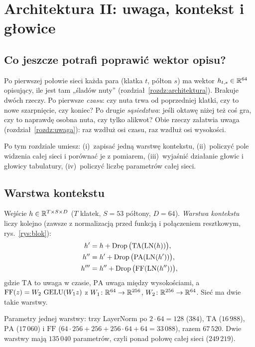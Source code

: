 \chapter{Architektura II: uwaga, kontekst i głowice}\label{rozdz:uwaga-wys}

\section{Co jeszcze potrafi poprawić wektor opisu?}

Po pierwszej połowie sieci każda para (klatka $t$, półton $s$) ma wektor $h_{t,s}\in\mathbb{R}^{64}$ opisujący, ile jest tam „śladów nuty” (rozdział~\ref{rozdz:architektura}). Brakuje dwóch rzeczy.
Po pierwsze \emph{czasu}: czy nuta trwa od poprzedniej klatki, czy to nowe szarpnięcie, czy koniec? Po drugie \emph{sąsiedztwa}: jeśli oktawę niżej też coś gra, czy to naprawdę osobna nuta, czy tylko alikwot? Obie rzeczy załatwia uwaga (rozdział~\ref{rozdz:uwaga}):
raz wzdłuż osi czasu, raz wzdłuż osi wysokości.

Po tym rozdziale umiesz: (i)~zapisać jedną warstwę kontekstu, (ii)~policzyć pole widzenia całej sieci i porównać je z pomiarem, (iii)~wyjaśnić działanie głowic i głowicy tabulatury, (iv)~policzyć liczbę parametrów całej sieci.

\section{Warstwa kontekstu}

\begin{definicja}\label{def:ctx}
Wejście $h\in\mathbb{R}^{T\times S\times D}$ ($T$ klatek, $S=53$ półtony, $D=64$). \emph{Warstwa kontekstu} liczy kolejno (zawsze z normalizacją przed funkcją i połączeniem resztkowym, rys.~\ref{rys:blok}):
\begin{align*}
h' &= h+\operatorname{Drop}\big(\mathrm{TA}(\operatorname{LN}(h))\big), \\
h'' &= h'+\operatorname{Drop}\big(\mathrm{PA}(\operatorname{LN}(h'))\big), \\
h''' &= h''+\operatorname{Drop}\big(\mathrm{FF}(\operatorname{LN}(h''))\big),
\end{align*}
gdzie $\mathrm{TA}$ to uwaga w czasie, $\mathrm{PA}$ uwaga między wysokościami, a $\mathrm{FF}(z)=W_2\,\operatorname{GELU}(W_1z)$ z $W_1\colon\mathbb{R}^{64}\to\mathbb{R}^{256}$, $W_2\colon\mathbb{R}^{256}\to\mathbb{R}^{64}$. Sieć ma dwie takie warstwy.
\end{definicja}

\begin{przyklad}\label{prz:ctx-param}
Parametry jednej warstwy: trzy LayerNorm po $2\cdot64=128$ ($384$), $\mathrm{TA}$ ($16\,988$), $\mathrm{PA}$ ($17\,060$) i $\mathrm{FF}$ ($64\cdot256+256+256\cdot64+64=33\,088$), razem $67\,520$. Dwie warstwy mają $135\,040$ parametrów, czyli ponad połowę całej sieci ($249\,219$).
\end{przyklad}

